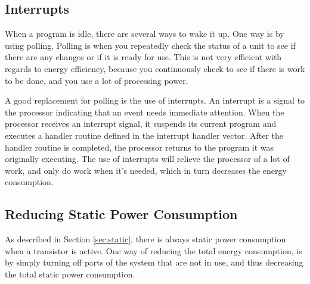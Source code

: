\subsection{Interrupts}
\label{sec:interrupts}
When a program is idle, there are several ways to wake it up. One way is by using polling. Polling is when you repeatedly check the status of a unit to see if there are any changes or if it is ready for use. This is not very efficient with regards to energy efficiency, because you continuously check to see if there is work to be done, and you use a lot of processing power. 

A good replacement for polling is the use of interrupts. An interrupt is a signal to the processor indicating that an event needs immediate attention. When the processor receives an interrupt signal, it suspends its current program and executes a handler routine defined in the interrupt handler vector. After the handler routine is completed, the processor returns to the program it was originally executing\cite{wolf2012computers}. The use of interrupts will relieve the processor of a lot of work, and only do work when it's needed, which in turn decreases the energy consumption.

\subsection{Reducing Static Power Consumption}
As described in Section \ref{sec:static}, there is always static power consumption when a transistor is active. One way of reducing the total energy consumption, is by simply turning off parts of the system that are not in use, and thus decreasing the total static power consumption. 